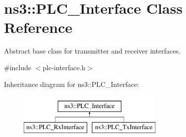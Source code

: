\hypertarget{classns3_1_1PLC__Interface}{\section{ns3\-:\-:\-P\-L\-C\-\_\-\-Interface \-Class \-Reference}
\label{classns3_1_1PLC__Interface}
}


\-Abstract base class for transmitter and receiver interfaces.  




{\ttfamily \#include $<$plc-\/interface.\-h$>$}

\-Inheritance diagram for ns3\-:\-:\-P\-L\-C\-\_\-\-Interface\-:\begin{figure}[H]
\begin{center}
\leavevmode
\includegraphics[height=2.000000cm]{classns3_1_1PLC__Interface}
\end{center}
\end{figure}

